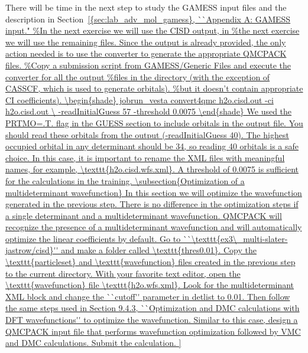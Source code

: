 There will be time in the next step to study the GAMESS input
files and the description in Section~\ref{{sec:lab_adv_mol_gamess}, ``Appendix A: GAMESS input." %
Since the output is already provided, the
only action needed is to use the converter to generate the appropriate QMCPACK files.  %
\begin{shade}
jobrun_vesta convert4qmc h2o.cisd.out -ci h2o.cisd.out \
-readInitialGuess 57 -threshold 0.0075
\end{shade}

We used the PRTMO=.T. flag in the GUESS section to include orbitals in the output file. You should read these orbitals from the output (-readInitialGuess 40).
The highest occupied orbital in any determinant should be 34, so reading 40 orbitals is a safe choice. In this case, it is important to rename the XML files with meaningful names, for example, \texttt{h2o.cisd.wfs.xml}. A threshold of 0.0075 is sufficient for the calculations in the training.


\subsection{Optimization of a multideterminant wavefunction}

In this section we will optimize the wavefunction generated in the previous step. There
is no difference in the optimization steps if a single determinant and a multideterminant wavefunction.
QMCPACK will recognize the presence of a multideterminant wavefunction and will automatically 
optimize the linear coefficients by default. Go to ``\texttt{ex3\_multi-slater-jastrow/cisd}'' and make a folder called 
\texttt{thres0.01}. Copy the \texttt{particleset} and \texttt{wavefunction} files created in the previous step to the current 
directory. With your favorite text editor, open the \texttt{wavefunction} file \texttt{h2o.wfs.xml}. Look for 
the multideterminant XML block and change the ``cutoff'' parameter in detlist to 0.01. Then follow 
the same steps used in Section 9.4.3, ``Optimization and DMC calculations with DFT wavefunctions''
to optimize the wavefunction. Similar to this case, design a QMCPACK input file that performs
wavefunction optimization followed by VMC and DMC calculations. Submit the calculation.

}

